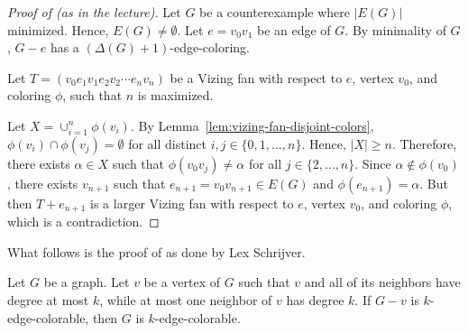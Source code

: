 \begin{proof}[Proof of  (as in the lecture)]
    Let \(G\) be a counterexample where \(|E(G)|\) minimized.
    Hence, \(E(G) \neq \emptyset\). Let \(e = v_0v_1\) be an edge of \(G\).
    By minimality of \(G\), \(G - e\) has a \((\Delta(G) + 1)\)-edge-coloring.

    Let \(T = (v_0e_1v_1e_2v_2 \cdots e_nv_n)\) be a Vizing fan with respect to \(e\), vertex \(v_0\), and coloring \(\phi\), such that \(n\) is maximized.

    Let \(X = \cup_{i=1}^n \phi(v_i)\).
    By Lemma~\ref{lem:vizing-fan-disjoint-colors},
    \(\phi(v_i) \cap \phi(v_j) = \emptyset\) for all distinct \(i, j \in \{0, 1, \ldots, n\}\).
    Hence, \(|X| \geq n\).
    Therefore, there exists \(\alpha \in X\) such that \(\phi(v_0v_j) \neq \alpha\) for all \(j \in \{2, \ldots, n\}\).
    Since \(\alpha \notin \phi(v_0)\),
    there exists \(v_{n+1}\) such that \(e_{n+1} = v_0v_{n+1} \in E(G)\) and \(\phi(e_{n+1}) = \alpha\).
    But then \(T + e_{n+1}\) is a larger Vizing fan with respect to \(e\), vertex \(v_0\), and coloring \(\phi\), which is a contradiction.
\end{proof}

What follows is the proof of  as done by Lex Schrijver.

\begin{lemma} \label{lem:lex-schrijver}
    Let \(G\) be a graph.
    Let \(v\) be a vertex of \(G\) such that
    \(v\) and all of its neighbors have degree at most \(k\),
    while at most one neighbor of \(v\) has degree \(k\).
    If \(G - v\) is \(k\)-edge-colorable,
    then \(G\) is \(k\)-edge-colorable.
\end{lemma}


